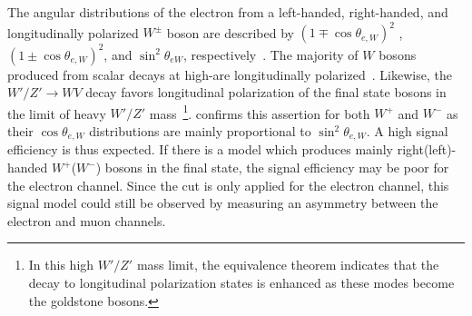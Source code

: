 The angular distributions of the electron from a left-handed, right-handed, and longitudinally polarized $W^{\pm}$ boson are
described by $(1\mp\cos\theta_{e,W})^2$  , $(1\pm\cos\theta_{e,W})^2$, and $\sin^2\theta_{eW}$, respectively~\cite{w_polarization}. The majority of $W$ bosons produced from scalar decays at high-\pt are longitudinally polarized~\cite{w_polarization_2}. Likewise, the $W'/Z'\rightarrow WV$ decay favors longitudinal polarization of the final state bosons in the limit of heavy $W'/Z'$ mass~\cite{hvt_polarization}\footnote{
	In this high $W'/Z'$ mass limit, the equivalence theorem indicates that the decay to longitudinal polarization states is enhanced as these modes become the goldstone bosons.
}. \Fig{\ref{fig:costhetastar}} confirms this assertion for both $W^+$ and $W^-$ as their $\cos\theta_{e,W}$ distributions are mainly proportional to $\sin^2\theta_{e,W}$.
A high signal efficiency is thus expected. If there is a model which produces mainly right(left)-handed $W^+$($W^-$) bosons in the final state, the signal efficiency may be poor for the electron channel.
Since the cut is only applied for the electron channel, this signal model could still be observed by measuring an asymmetry between the electron and muon channels.

